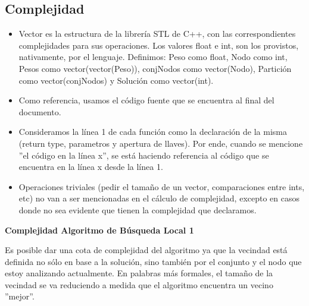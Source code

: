 \subsection{Complejidad}
\begin{itemize}
\item Vector es la estructura de la librería STL de C++, con las correspondientes complejidades para sus operaciones. Los valores float e int, son los provistos, nativamente, por el lenguaje. Definimos: Peso como float, Nodo como int, Pesos como vector(vector(Peso)), conjNodos como vector(Nodo), Partición como vector(conjNodos) y Solución como vector(int).
\item Como referencia, usamos el código fuente que se encuentra al final del documento.
\item Consideramos la línea 1 de cada función como la declaración de la misma (return type, parametros y apertura de llaves). Por ende, cuando se mencione ''el código en la línea x'', se está haciendo referencia al código que se encuentra en la línea x desde la línea 1.
\item Operaciones triviales (pedir el tamaño de un vector, comparaciones entre ints, etc) no van a ser mencionadas en el cálculo de complejidad, excepto en casos donde no sea evidente que tienen la complejidad que declaramos.
\end{itemize}

\textbf{Complejidad Algoritmo de Búsqueda Local 1}

Es posible dar una cota de complejidad del algoritmo ya que la vecindad está definida no sólo en base a la solución, sino también por el conjunto y el nodo que estoy analizando actualmente. En palabras más formales, el tamaño de la vecindad se va reduciendo a medida que el algoritmo encuentra un vecino ''mejor''.

